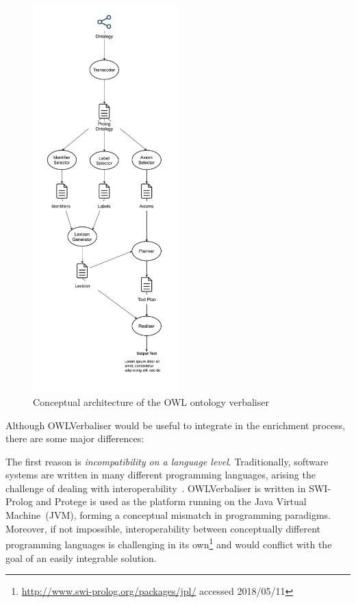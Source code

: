 \documentclass[draft,final]{vutinfth} %
\begin{document}
\begin{figure}
	 \centering
	 \includegraphics[width=0.5\textwidth]{drawio/Ontology_Verbaliser_Architecture}
	 \caption{Conceptual architecture of the OWL ontology verbaliser~\cite{stevens2011}}\label{fig:verbaliser_architecture}
\end{figure}

Although OWLVerbaliser would be useful to integrate in the enrichment process, there are some major differences:

The first reason is \emph{incompatibility on a language level}. Traditionally, software systems are written in many different programming languages, arising the challenge of dealing with interoperability~\cite{malone2014}. OWLVerbaliser is written in SWI-Prolog and Protege is used as the platform running on the Java Virtual Machine~(JVM), forming a conceptual mismatch in programming paradigms. Moreover, if not impossible, interoperability between conceptually different programming languages is challenging in its own\footnote{\url{http://www.swi-prolog.org/packages/jpl/} accessed 2018/05/11} and would conflict with the goal of an easily integrable solution.
\end{document}
